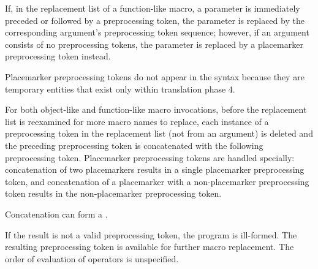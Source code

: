 \pnum
If, in the replacement list of a function-like macro, a parameter is
immediately preceded or followed by a
\tcode{\#\#}
preprocessing token, the parameter is replaced by the
corresponding argument's preprocessing token sequence; however, if an argument consists of no preprocessing tokens, the parameter is
replaced by a placemarker preprocessing token instead.
\begin{footnote}
Placemarker preprocessing tokens do not appear in the syntax
because they are temporary entities that exist only within translation phase 4.
\end{footnote}

\pnum
For both object-like and function-like macro invocations, before the
replacement list is reexamined for more macro names to replace,
each instance of a
\tcode{\#\#}
preprocessing token in the replacement list
(not from an argument) is deleted and the
preceding preprocessing token is concatenated
with the following preprocessing token.
Placemarker preprocessing tokens are handled specially: concatenation
of two placemarkers results in a single placemarker preprocessing token, and
concatenation of a placemarker with a non-placemarker preprocessing token results
in the non-placemarker preprocessing token.
\begin{note}
Concatenation can form
a .
\end{note}
If the result is not a valid preprocessing token,
the program is ill-formed.
The resulting preprocessing token is available for further macro replacement.
The order of evaluation of
\tcode{\#\#}
operators is unspecified.

